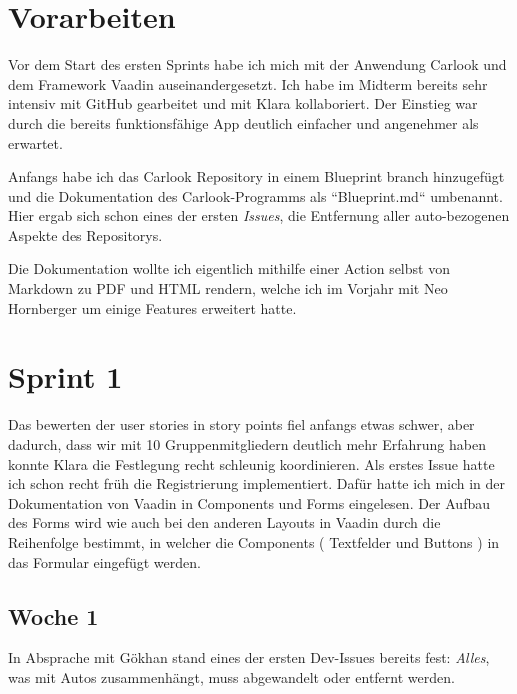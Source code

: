 \section{Vorarbeiten}\label{sec:vorarbeiten}
Vor dem Start des ersten Sprints habe ich mich
mit der Anwendung Carlook und dem Framework Vaadin auseinandergesetzt.
Ich habe im Midterm bereits sehr intensiv mit GitHub gearbeitet und mit Klara kollaboriert.
Der Einstieg war durch die bereits funktionsfähige App deutlich einfacher und angenehmer als erwartet.

Anfangs habe ich das Carlook Repository in einem Blueprint branch hinzugefügt und die Dokumentation
des Carlook-Programms als ``Blueprint.md`` umbenannt.
Hier ergab sich schon eines der ersten \emph{Issues}, die Entfernung aller auto-bezogenen Aspekte
des Repositorys.

Die Dokumentation wollte ich eigentlich mithilfe einer Action selbst von Markdown zu PDF und HTML rendern, welche
ich im Vorjahr mit Neo Hornberger um einige Features erweitert hatte.


\section{Sprint 1}\label{sec:sprint1}
Das bewerten der user stories in story points fiel anfangs etwas schwer, aber dadurch, dass wir mit 10 Gruppenmitgliedern
deutlich mehr Erfahrung haben konnte Klara die Festlegung recht schleunig koordinieren.
Als erstes Issue hatte ich schon recht früh die Registrierung implementiert.
Dafür hatte ich mich in der Dokumentation von Vaadin in Components und Forms eingelesen.
Der Aufbau des Forms wird wie auch bei den anderen Layouts in Vaadin durch die Reihenfolge bestimmt,
in welcher die Components ( Textfelder und Buttons ) in das Formular eingefügt werden.

\subsection{Woche 1}\label{subsec:woche1}
In Absprache mit Gökhan stand eines der ersten Dev-Issues bereits fest: \emph{Alles}, was mit Autos
zusammenhängt, muss abgewandelt oder entfernt werden.

